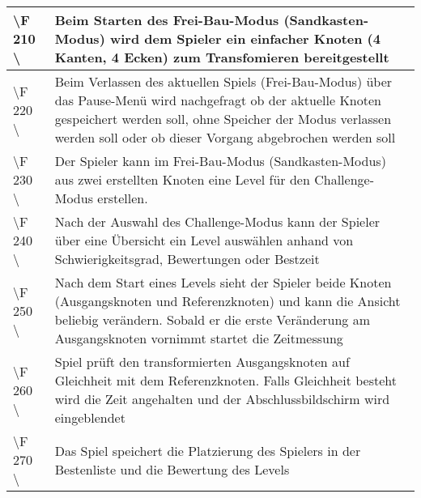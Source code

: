 \documentclass[10pt]{article}
\begin{document}
\begin{tabular}{|p{}|p{}|}
\hline
\textbackslash F 210  \textbackslash  & Beim Starten des Frei-Bau-Modus (Sandkasten-Modus) wird dem Spieler ein einfacher Knoten (4 Kanten, 4 Ecken) zum Transfomieren bereitgestellt \\
\hline
\textbackslash F 220  \textbackslash  & Beim Verlassen des aktuellen Spiels (Frei-Bau-Modus) über das Pause-Menü wird nachgefragt ob der aktuelle Knoten gespeichert werden soll, ohne Speicher der Modus verlassen werden soll oder ob dieser Vorgang abgebrochen werden soll\\
\hline
\textbackslash F 230  \textbackslash  & Der Spieler kann im Frei-Bau-Modus (Sandkasten-Modus) aus zwei erstellten Knoten eine Level für den Challenge-Modus erstellen.\\
\hline
\textbackslash F 240  \textbackslash  & Nach der Auswahl des Challenge-Modus kann der Spieler über eine Übersicht ein Level auswählen anhand von Schwierigkeitsgrad, Bewertungen oder Bestzeit \\
\hline
\textbackslash F 250  \textbackslash  & Nach dem Start eines Levels sieht der Spieler beide Knoten (Ausgangsknoten und Referenzknoten) und kann die Ansicht beliebig verändern. Sobald er die erste Veränderung am Ausgangsknoten vornimmt startet die Zeitmessung\\
\hline
\textbackslash F 260  \textbackslash  & Spiel prüft den transformierten Ausgangsknoten auf Gleichheit mit dem Referenzknoten. Falls Gleichheit besteht wird die Zeit angehalten und der Abschlussbildschirm wird eingeblendet \\
\hline
\textbackslash F 270  \textbackslash  & Das Spiel speichert die Platzierung des Spielers in der Bestenliste und die Bewertung des Levels\\
\hline
\end{tabular} 
\end{document}
